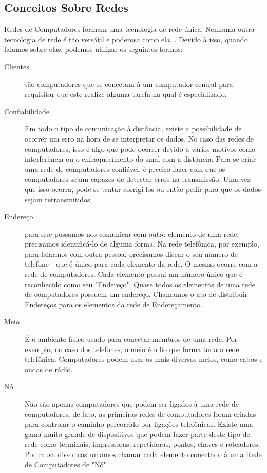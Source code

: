 	\subsection{Conceitos Sobre Redes}
	Redes de Computadores formam uma tecnologia de rede única. Nenhuma outra tecnologia de rede é tão versátil e poderosa como ela. \cite{morimoto2006}. Devido à isso, quando falamos sobre elas, podemos utilizar os seguintes termos:
	\begin{description}
		\item[Clientes] são computadores que se conectam à um computador central para requisitar que este realize alguma tarefa na qual é especializado.
		\item[Confiabilidade] Em todo o tipo de comunicação à distância, existe a possibilidade de ocorrer um erro na hora de se interpretar os dados. No caso das redes de computadores, isso é algo que pode ocorrer devido à vários motivos como interferência ou o enfraquecimento do sinal com a distância. Para se criar uma rede de computadores confiável, é preciso fazer com que os computadores sejam capazes de detectar erros na transmissão. Uma vez que isso ocorra, pode-se tentar corrigí-los ou então pedir para que os dados sejam retransmitidos.
		\item[Endereço] para que possamos nos comunicar com outro elemento de uma rede, precisamos identificá-lo de alguma forma. Na rede telefônica, por exemplo, para falarmos com outra pessoa, precisamos discar o seu número de telefone - que é único para cada elemento da rede. O mesmo ocorre com a rede de computadores. Cada elemento possui um número único que é reconhecido como seu "Endereço". Quase todos os elementos de uma rede de computadores possuem um endereço. Chamamos o ato de distribuir Endereços para os elementos da rede de Endereçamento.
		\item[Meio] É o ambiente físico usado para conectar membros de uma rede. Por exemplo, no caso dos telefones, o meio é o fio que forma toda a rede telefônica. Computadores podem usar os mais diversos meios, como cabos e ondas de rádio.
		\item[Nó] Não são apenas computadores que podem ser ligados à uma rede de computadores. de fato, as primeiras redes de computadores foram criadas para controlar o caminho percorrido por ligações telefônicas. Existe uma gama muito grande de dispositivos que podem fazer parte deste tipo de rede como terminais, impressoras, repetidoras, pontes, chaves e roteadores. Por causa disso, costumamos chamar cada elemento conectado à uma Rede de Computadores de "Nó".

\end{description}
